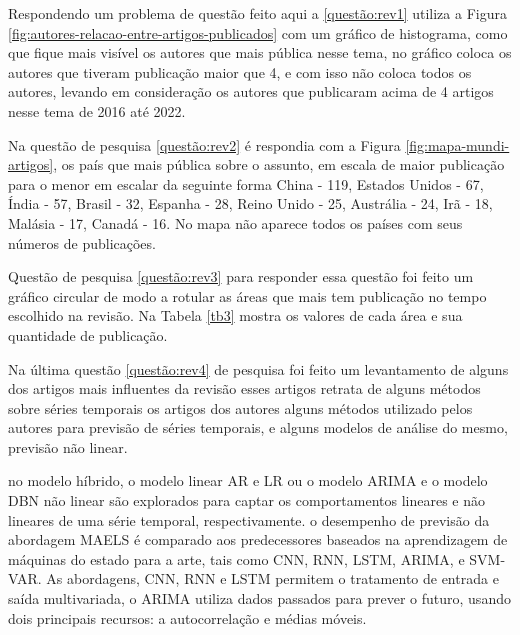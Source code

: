  Respondendo um problema de questão feito aqui a \ref{questão:rev1} utiliza a Figura \ref{fig:autores-relacao-entre-artigos-publicados} com um gráfico de histograma, como que fique mais visível os autores que mais pública nesse tema, no gráfico coloca os autores que tiveram publicação maior que 4, e com isso não coloca todos os autores, levando em consideração os autores que publicaram acima de 4 artigos nesse tema de 2016 até 2022.





Na questão de pesquisa \ref{questão:rev2} é respondia com a Figura \ref{fig:mapa-mundi-artigos}, os país que mais pública sobre o assunto, em escala de maior publicação para o menor em escalar da seguinte forma China - 119, Estados Unidos - 67, Índia - 57, Brasil - 32, Espanha - 28, Reino Unido - 25, Austrália - 24, Irã - 18, Malásia - 17, Canadá - 16. No mapa não aparece todos os países com seus números de publicações.




Questão de pesquisa \ref{questão:rev3} para responder essa questão foi feito um gráfico circular de modo a rotular as áreas que mais tem publicação no tempo escolhido na revisão. Na Tabela \ref{tb3} mostra os valores de cada área e sua quantidade de publicação. 


	



Na última questão \ref{questão:rev4} de pesquisa foi feito um levantamento de alguns dos artigos mais influentes da revisão esses artigos retrata de alguns métodos sobre séries temporais os artigos dos autores 
 alguns métodos utilizado pelos autores para previsão de séries temporais, e alguns modelos de análise do mesmo, previsão não linear. 
 
  no modelo híbrido, o modelo linear AR e LR ou o modelo ARIMA e o modelo DBN não linear são explorados para captar os comportamentos lineares e não lineares de uma série temporal, respectivamente.  o desempenho de previsão da abordagem MAELS é comparado aos predecessores baseados na aprendizagem de máquinas do estado para a arte, tais como CNN, RNN, LSTM, ARIMA, e SVM-VAR. As abordagens, CNN, RNN e LSTM permitem o tratamento de entrada e saída multivariada, o ARIMA utiliza dados passados para prever o futuro, usando dois principais recursos: a autocorrelação e médias móveis.

